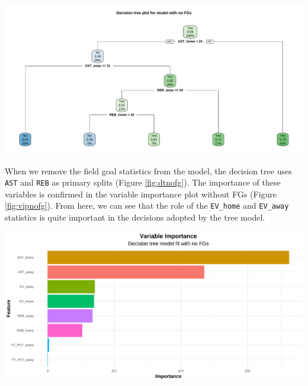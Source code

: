 \documentclass[
  12pt,
  a4paper,
]{article}
\let\origfigure\figure
\let\endorigfigure\endfigure
\renewenvironment{figure}[1][2] {
    \expandafter\origfigure\expandafter[H]
} {
    \endorigfigure
}
\begin{document}
\begin{figure}

{\centering \includegraphics[width=1\linewidth]{latex/plots/plot_9} 

}

\caption{Decision tree plot for model without shooting variables}\label{fig:dtnofg}
\end{figure}

When we remove the field goal statistics from the model, the decision tree uses \texttt{AST} and \texttt{REB} as primary splits (Figure \ref{fig:dtnofg}). The importance of these variables is confirmed in the variable importance plot without FGs (Figure \ref{fig:vipnofg}). From here, we can see that the role of the \texttt{EV\_home} and \texttt{EV\_away} statistics is quite important in the decisions adopted by the tree model.

\begin{figure}

{\centering \includegraphics[width=1\linewidth]{latex/plots/plot_10} 

}

\caption{Variable Importance plot for model without shooting variables}\label{fig:vipnofg}
\end{figure}
\end{document}
